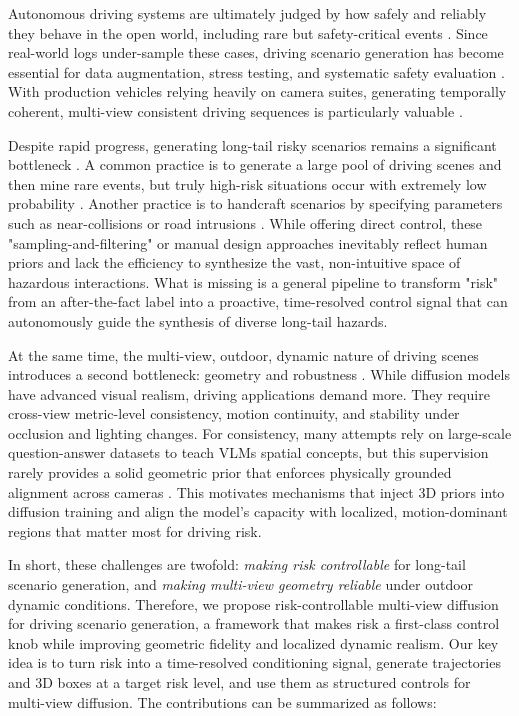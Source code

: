\documentclass{article}
\begin{document}
Autonomous driving systems are ultimately judged by how safely and reliably they behave in the open world, including rare but safety-critical events \cite{zhang2026world,he2025dual,fei2024critical}. Since real-world logs under-sample these cases, driving scenario generation has become essential for data augmentation, stress testing, and systematic safety evaluation \cite{mei2025llm,lin2023generative,wang2025safety}. With production vehicles relying heavily on camera suites, generating temporally coherent, multi-view consistent driving sequences is particularly valuable \cite{zhang2025can, lin2025high}.

Despite rapid progress, generating long-tail risky scenarios remains a significant bottleneck \cite{he2025generative}. A common practice is to generate a large pool of driving scenes and then mine rare events, but truly high-risk situations occur with extremely low probability \cite{zhang2024chatscene}. Another practice is to handcraft scenarios by specifying parameters such as near-collisions or road intrusions \cite{xu2025diffscene}. While offering direct control, these "sampling-and-filtering" or manual design approaches inevitably reflect human priors and lack the efficiency to synthesize the vast, non-intuitive space of hazardous interactions. What is missing is a general pipeline to transform "risk" from an after-the-fact label into a proactive, time-resolved control signal that can autonomously guide the synthesis of diverse long-tail hazards.

At the same time, the multi-view, outdoor, dynamic nature of driving scenes introduces a second bottleneck: geometry and robustness \cite{cai2026text2scenario}. While diffusion models have advanced visual realism, driving applications demand more. They require cross-view metric-level consistency, motion continuity, and stability under occlusion and lighting changes. For consistency, many attempts rely on large-scale question-answer datasets to teach VLMs spatial concepts, but this supervision rarely provides a solid geometric prior that enforces physically grounded alignment across cameras \cite{wang2026vggdrive, qu2023envisioning}. This motivates mechanisms that inject 3D priors into diffusion training and align the model’s capacity with localized, motion-dominant regions that matter most for driving risk.

In short, these challenges are twofold: \textit{making risk controllable} for long-tail scenario generation, and \textit{making multi-view geometry reliable} under outdoor dynamic conditions. Therefore, we propose risk-controllable multi-view diffusion for driving scenario generation, a framework that makes risk a first-class control knob while improving geometric fidelity and localized dynamic realism. Our key idea is to turn risk into a time-resolved conditioning signal, generate trajectories and 3D boxes at a target risk level, and use them as structured controls for multi-view diffusion. The contributions can be summarized as follows:
\end{document}
